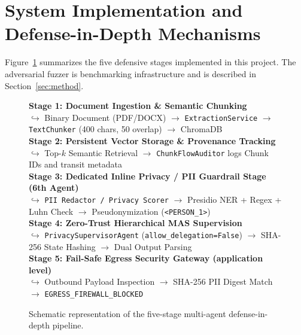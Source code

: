 \documentclass[11pt,a4paper]{article}
\begin{document}
\section{System Implementation and Defense-in-Depth Mechanisms}

Figure~\ref{fig:architecture-diagram} summarizes the five defensive stages implemented in this project. The adversarial fuzzer is benchmarking infrastructure and is described in Section~\ref{sec:method}.

\begin{figure}[htbp]
\centering
\begin{tcolorbox}[colback=lightbg,colframe=primarynavy,title=\textbf{The Five-Stage Defense-in-Depth Multi-Agent Pipeline},sharp corners,boxrule=1pt]
\small
\textbf{Stage 1: Document Ingestion \& Semantic Chunking} \\
$\hookrightarrow$ Binary Document (PDF/DOCX) $\longrightarrow$ \texttt{ExtractionService} $\longrightarrow$ \texttt{TextChunker} (400 chars, 50 overlap) $\longrightarrow$ ChromaDB \\[0.5em]
\textbf{Stage 2: Persistent Vector Storage \& Provenance Tracking} \\
$\hookrightarrow$ Top-$k$ Semantic Retrieval $\longrightarrow$ \texttt{ChunkFlowAuditor} logs Chunk IDs and transit metadata \\[0.5em]
\textbf{Stage 3: Dedicated Inline Privacy / PII Guardrail Stage (6th Agent)} \\
$\hookrightarrow$ \texttt{PII Redactor / Privacy Scorer} $\longrightarrow$ Presidio NER + Regex + Luhn Check $\longrightarrow$ Pseudonymization (\texttt{<PERSON\_1>}) \\[0.5em]
\textbf{Stage 4: Zero-Trust Hierarchical MAS Supervision} \\
$\hookrightarrow$ \texttt{PrivacySupervisorAgent} (\texttt{allow\_delegation=False}) $\longrightarrow$ SHA-256 State Hashing $\longrightarrow$ Dual Output Parsing \\[0.5em]
\textbf{Stage 5: Fail-Safe Egress Security Gateway (application level)} \\
$\hookrightarrow$ Outbound Payload Inspection $\longrightarrow$ SHA-256 PII Digest Match $\longrightarrow$ \texttt{EGRESS\_FIREWALL\_BLOCKED}
\end{tcolorbox}
\caption{Schematic representation of the five-stage multi-agent defense-in-depth pipeline.}
\label{fig:architecture-diagram}
\end{figure}
\end{document}
